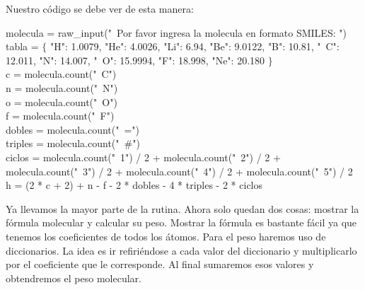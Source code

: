 \documentclass[10pt,letterpaper]{article}
\newenvironment{Code}
{
\begin{lrbox}{\selvestebox}%
\begin{minipage}{\dimexpr\columnwidth-2\fboxsep\relax}
\fontfamily{\ttdefault}\selectfont
}
{\end{minipage}\end{lrbox}%
\begin{center}
\colorbox{light-gray}{\usebox{\selvestebox}}
\end{center}
}
\begin{document}
\noindent Nuestro c\'odigo se debe ver de esta manera:

\begin{Code}
molecula = raw\_input("\ \hspace{-2mm}Por favor ingresa la molecula en formato SMILES: ")\\
tabla = $\lbrace$ "H": 1.0079, "He": 4.0026, "Li": 6.94, "Be": 9.0122, "B": 10.81, "\ \hspace{-2mm}C": 12.011, "N": 14.007, "\ \hspace{-2mm}O": 15.9994, "F": 18.998, "Ne": 20.180 $\rbrace$\\
c = molecula.count("\ \hspace{-2mm}C")\\
n = molecula.count("\ \hspace{-2mm}N")\\
o = molecula.count("\ \hspace{-2mm}O")\\
f = molecula.count("\ \hspace{-2mm}F")\\
dobles = molecula.count("\ \hspace{-2mm}=")\\
triples = molecula.count("\ \hspace{-2mm}\#")\\
ciclos = molecula.count("\ \hspace{-2mm}1") / 2 + molecula.count("\ \hspace{-2mm}2") / 2 + molecula.count("\ \hspace{-2mm}3") / 2 + molecula.count("\ \hspace{-2mm}4") / 2 + molecula.count("\ \hspace{-2mm}5") / 2\\
h = (2 * c + 2) + n - f - 2 * dobles - 4 * triples - 2 * ciclos
\end{Code}

\noindent Ya llevamos la mayor parte de la rutina. Ahora solo quedan dos cosas: mostrar la f\'ormula molecular y calcular su peso. Mostrar la f\'ormula es bastante f\'acil ya que tenemos los coeficientes de todos los \'atomos. Para el peso haremos uso de diccionarios. La idea es ir refiri\'endose a cada valor del diccionario y multiplicarlo por el coeficiente que le corresponde. Al final sumaremos esos valores y obtendremos el peso molecular.
\end{document}
